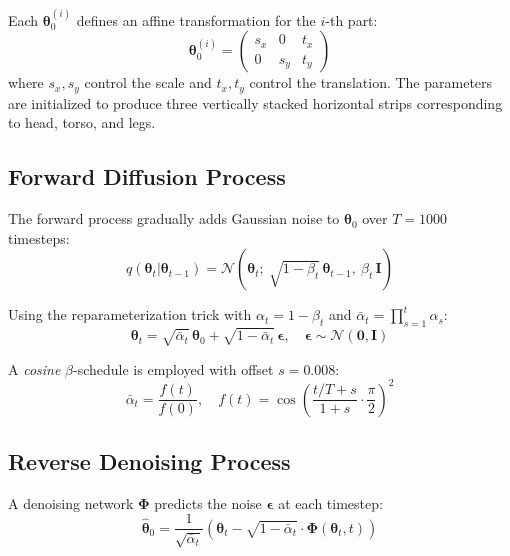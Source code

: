 Each $\boldsymbol{\theta}_0^{(i)}$ defines an affine transformation for the $i$-th part:
\begin{equation}
    \boldsymbol{\theta}_0^{(i)} = \begin{pmatrix} s_x & 0 & t_x \\ 0 & s_y & t_y \end{pmatrix}
\end{equation}
where $s_x, s_y$ control the scale and $t_x, t_y$ control the translation. The parameters are initialized to produce three vertically stacked horizontal strips corresponding to head, torso, and legs.

\subsection{Forward Diffusion Process}

The forward process gradually adds Gaussian noise to $\boldsymbol{\theta}_0$ over $T = 1000$ timesteps:
\begin{equation}
    q(\boldsymbol{\theta}_t | \boldsymbol{\theta}_{t-1}) = \mathcal{N}\left(\boldsymbol{\theta}_t;\ \sqrt{1-\beta_t}\,\boldsymbol{\theta}_{t-1},\ \beta_t\,\mathbf{I}\right)
\end{equation}

Using the reparameterization trick with $\alpha_t = 1 - \beta_t$ and $\bar{\alpha}_t = \prod_{s=1}^{t}\alpha_s$:
\begin{equation}
    \boldsymbol{\theta}_t = \sqrt{\bar{\alpha}_t}\,\boldsymbol{\theta}_0 + \sqrt{1 - \bar{\alpha}_t}\,\boldsymbol{\epsilon}, \quad \boldsymbol{\epsilon} \sim \mathcal{N}(\mathbf{0}, \mathbf{I})
\end{equation}

A \textit{cosine} $\beta$-schedule \cite{ho2020denoising} is employed with offset $s = 0.008$:
\begin{equation}
    \bar{\alpha}_t = \frac{f(t)}{f(0)}, \quad f(t) = \cos\left(\frac{t/T + s}{1 + s} \cdot \frac{\pi}{2}\right)^2
\end{equation}

\subsection{Reverse Denoising Process}

A denoising network $\boldsymbol{\Phi}$ predicts the noise $\boldsymbol{\epsilon}$ at each timestep:
\begin{equation}
    \hat{\boldsymbol{\theta}}_0 = \frac{1}{\sqrt{\bar{\alpha}_t}} \left( \boldsymbol{\theta}_t - \sqrt{1 - \bar{\alpha}_t} \cdot \boldsymbol{\Phi}(\boldsymbol{\theta}_t, t) \right)
\end{equation}


